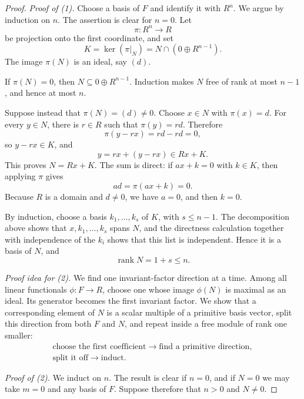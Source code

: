 \begin{proof}
\emph{Proof of (1).}
Choose a basis of \(F\) and identify it with \(R^n\). We argue by induction
on \(n\). The assertion is clear for \(n=0\). Let
\[
\pi:R^n\longrightarrow R
\]
be projection onto the first coordinate, and set
\[
K=\ker(\pi|_N)=N\cap(0\oplus R^{n-1}).
\]
The image \(\pi(N)\) is an ideal, say \((d)\).

If \(\pi(N)=0\), then \(N\subseteq0\oplus R^{n-1}\). Induction makes \(N\)
free of rank at most \(n-1\), and hence at most \(n\).

Suppose instead that \(\pi(N)=(d)\ne0\). Choose \(x\in N\) with
\(\pi(x)=d\). For every \(y\in N\), there is \(r\in R\) such that
\(\pi(y)=rd\). Therefore
\[
\pi(y-rx)=rd-rd=0,
\]
so \(y-rx\in K\), and
\[
y=rx+(y-rx)\in Rx+K.
\]
This proves \(N=Rx+K\). The sum is direct: if \(ax+k=0\) with \(k\in K\),
then applying \(\pi\) gives
\[
ad=\pi(ax+k)=0.
\]
Because \(R\) is a domain and \(d\ne0\), we have \(a=0\), and then \(k=0\).

By induction, choose a basis \(k_1,\ldots,k_s\) of \(K\), with
\(s\leq n-1\). The decomposition above shows that
\(x,k_1,\ldots,k_s\) spans \(N\), and the directness calculation together
with independence of the \(k_i\) shows that this list is independent. Hence
it is a basis of \(N\), and
\[
\operatorname{rank}N=1+s\leq n.
\]

\medskip
\noindent\emph{Proof idea for (2).}
We find one invariant-factor direction at a time.  Among all linear
functionals \(\phi:F\to R\), choose one whose image \(\phi(N)\) is maximal
as an ideal.  Its generator becomes the first invariant factor.  We show that
a corresponding element of \(N\) is a scalar multiple of a primitive basis
vector, split this direction from both \(F\) and \(N\), and repeat inside a
free module of rank one smaller:
\[
\begin{gathered}
\text{choose the first coefficient}\longrightarrow
\text{find a primitive direction},\\
\text{split it off}\longrightarrow\text{induct}.
\end{gathered}
\]

\medskip
\noindent\emph{Proof of (2).}
We induct on \(n\).  The result is clear if \(n=0\), and if \(N=0\) we may
take \(m=0\) and any basis of \(F\).  Suppose therefore that \(n>0\) and
\(N\ne0\).


\end{proof}
